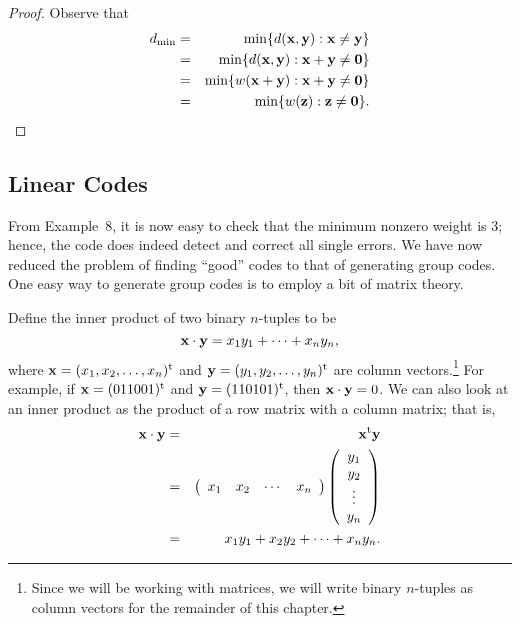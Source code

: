  
\begin{proof}
Observe that
\begin{eqnarray*}
d_{\min} &= & \min \{ d({\bold x},{\bold y}) : {\bold x}
\neq
{\bold y} \} \\
&= & \min \{ d({\bold x},{\bold y}) : {\bold x}+{\bold y}
\neq {\bold 0} \} \\
&=& \min\{ w({\bold x} + {\bold y}) : {\bold x}+{\bold y}
\neq {\bold 0} \} \\
& = & \min\{ w({\bold z}) : {\bold z} \neq {\bold 0} \}.
\end{eqnarray*}
\end{proof}
 
 
\subsection*{Linear Codes}
 
 
From Example~8, it is now easy to check that the minimum nonzero
weight is 3; hence, the code does indeed detect and correct all
single errors. We have now reduced the problem of finding ``good''
codes to that of generating group codes. One easy way to generate
group codes is to employ a bit of matrix theory. 
 
 
Define the {\bfi inner product\/} of two binary
$n$-tuples to be 
\[
{\bold x} \cdot {\bold y} = x_1 y_1 + \cdots + x_n y_n,
\]
where ${\bold x} = (x_1, x_2, \ldots, x_n)^{\rm t}$ and ${\bold y} =
(y_1, y_2, \ldots, y_n)^{\rm t}$ are column vectors.\footnote{Since we
will be working with matrices, we will write binary $n$-tuples as
column vectors for the remainder of this chapter.} For example, if
${\bold x} = (011001)^{\rm t}$ and ${\bold y} = (110101)^{\rm t}$,
then ${\bold x} \cdot {\bold y} = 0$. We can also look at an inner
product as the product of a row matrix with a column matrix; that is, 
\begin{eqnarray*}
{\bold x} \cdot {\bold y} & = & {\bold x}^{\rm t}  {\bold y}
\\
& = &
\left(
\begin{array}{cccc}
x_1 & x_2 & \cdots & x_n
\end{array}
\right)
\left(
\begin{array}{c}
y_1 \\
y_2 \\
\vdots \\
y_n
\end{array}
\right) \\
& = &
x_{1}y_{1} + x_{2}y_{2} + \cdots + x_{n}y_{n}.
\end{eqnarray*}
 
